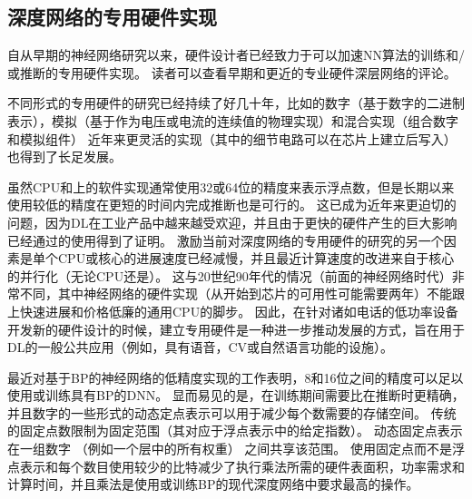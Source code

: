 \subsection{深度网络的专用硬件实现}
\label{sec:specialized_hardware_implementations_of_deep_networks}

自从早期的神经网络研究以来，硬件设计者已经致力于可以加速\gls{NN}算法的训练和/或推断的专用硬件实现。
读者可以查看早期和更近的专业硬件深层网络的评论\citep{Lindsey+Lindblad-1994,Beiu-et-al-2003,Misra+Saha-2010}。

不同形式的专用硬件\citep{Graf+Jackel-1989,Mead+Ismail-2012,Kim-et-al-2009,Pham-et-al-2012,Chen-et-al-IEEE2014,Chen-et-al-ACM2014}的研究已经持续了好几十年，比如的数字（基于数字的二进制表示），模拟\citep{Graf+Jackel-1989,Mead+Ismail-2012}（基于作为电压或电流的连续值的物理实现）和混合实现（组合数字和模拟组件）
近年来更灵活的实现（其中的细节电路可以在芯片上建立后写入）也得到了长足发展。



虽然CPU和上的软件实现通常使用32或64位的精度来表示浮点数，但是长期以来使用较低的精度在更短的时间内完成推断也是可行的\citep{Holt-et-al-1991,Holi+Hwang-1993,Presley-et-al-1994,Simard+Graf-NIPS1994,Wawrzynek-et-al-IEEE1996,Savich-et-al-2007}。
这已成为近年来更迫切的问题，因为\gls{DL}在工业产品中越来越受欢迎，并且由于更快的硬件产生的巨大影响已经通过的使用得到了证明。
激励当前对深度网络的专用硬件的研究的另一个因素是单个CPU或核心的进展速度已经减慢，并且最近计算速度的改进来自于核心的并行化（无论CPU还是）。
这与20世纪90年代的情况（前面的神经网络时代）非常不同，其中神经网络的硬件实现（从开始到芯片的可用性可能需要两年）不能跟上快速进展和价格低廉的通用CPU的脚步。
因此，在针对诸如电话的低功率设备开发新的硬件设计的时候，建立专用硬件是一种进一步推动发展的方式，旨在用于\gls{DL}的一般公共应用（例如，具有语音，\gls{CV}或自然语言功能的设施）。


最近对基于\gls{BP}的神经网络的低精度实现的工作\citep{Vanhoucke-et-al-2011,Courbariaux-et-al-ICLR2015workshop,Gupta-et-al-2015}表明，8和16位之间的精度可以足以使用或训练具有\gls{BP}的\gls{DNN}。
显而易见的是，在训练期间需要比在推断时更精确，并且数字的一些形式的动态定点表示可以用于减少每个数需要的存储空间。
传统的固定点数限制为固定范围（其对应于浮点表示中的给定指数）。
动态固定点表示在一组数字 （例如一个层中的所有权重） 之间共享该范围。
使用固定点而不是浮点表示和每个数目使用较少的比特减少了执行乘法所需的硬件表面积，功率需求和计算时间，并且乘法是使用或训练\gls{BP}的现代深度网络中要求最高的操作。




